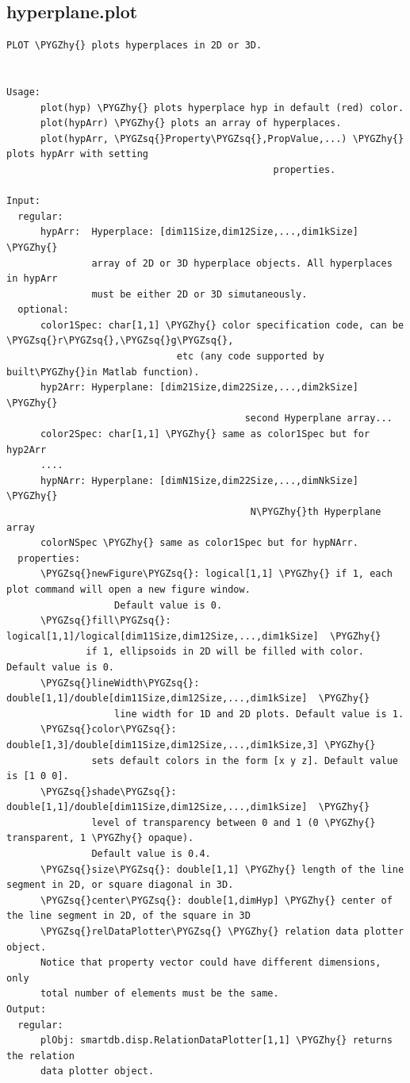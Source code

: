 \documentclass[letterpaper,10pt,english]{sphinxmanual}
\def\PYGZhy{\char`\-}
\def\PYGZsq{\char`\'}
\begin{document}
\subsection{hyperplane.plot}
\label{chap_functions:hyperplane-plot}
\begin{Verbatim}[commandchars=\\\{\}]
PLOT \PYGZhy{} plots hyperplaces in 2D or 3D.


Usage:
      plot(hyp) \PYGZhy{} plots hyperplace hyp in default (red) color.
      plot(hypArr) \PYGZhy{} plots an array of hyperplaces.
      plot(hypArr, \PYGZsq{}Property\PYGZsq{},PropValue,...) \PYGZhy{} plots hypArr with setting
                                               properties.

Input:
  regular:
      hypArr:  Hyperplace: [dim11Size,dim12Size,...,dim1kSize] \PYGZhy{}
               array of 2D or 3D hyperplace objects. All hyperplaces in hypArr
               must be either 2D or 3D simutaneously.
  optional:
      color1Spec: char[1,1] \PYGZhy{} color specification code, can be \PYGZsq{}r\PYGZsq{},\PYGZsq{}g\PYGZsq{},
                              etc (any code supported by built\PYGZhy{}in Matlab function).
      hyp2Arr: Hyperplane: [dim21Size,dim22Size,...,dim2kSize] \PYGZhy{}
                                          second Hyperplane array...
      color2Spec: char[1,1] \PYGZhy{} same as color1Spec but for hyp2Arr
      ....
      hypNArr: Hyperplane: [dimN1Size,dim22Size,...,dimNkSize] \PYGZhy{}
                                           N\PYGZhy{}th Hyperplane array
      colorNSpec \PYGZhy{} same as color1Spec but for hypNArr.
  properties:
      \PYGZsq{}newFigure\PYGZsq{}: logical[1,1] \PYGZhy{} if 1, each plot command will open a new figure window.
                   Default value is 0.
      \PYGZsq{}fill\PYGZsq{}: logical[1,1]/logical[dim11Size,dim12Size,...,dim1kSize]  \PYGZhy{}
              if 1, ellipsoids in 2D will be filled with color. Default value is 0.
      \PYGZsq{}lineWidth\PYGZsq{}: double[1,1]/double[dim11Size,dim12Size,...,dim1kSize]  \PYGZhy{}
                   line width for 1D and 2D plots. Default value is 1.
      \PYGZsq{}color\PYGZsq{}: double[1,3]/double[dim11Size,dim12Size,...,dim1kSize,3] \PYGZhy{}
               sets default colors in the form [x y z]. Default value is [1 0 0].
      \PYGZsq{}shade\PYGZsq{}: double[1,1]/double[dim11Size,dim12Size,...,dim1kSize]  \PYGZhy{}
               level of transparency between 0 and 1 (0 \PYGZhy{} transparent, 1 \PYGZhy{} opaque).
               Default value is 0.4.
      \PYGZsq{}size\PYGZsq{}: double[1,1] \PYGZhy{} length of the line segment in 2D, or square diagonal in 3D.
      \PYGZsq{}center\PYGZsq{}: double[1,dimHyp] \PYGZhy{} center of the line segment in 2D, of the square in 3D
      \PYGZsq{}relDataPlotter\PYGZsq{} \PYGZhy{} relation data plotter object.
      Notice that property vector could have different dimensions, only
      total number of elements must be the same.
Output:
  regular:
      plObj: smartdb.disp.RelationDataPlotter[1,1] \PYGZhy{} returns the relation
      data plotter object.
\end{Verbatim}
\end{document}
